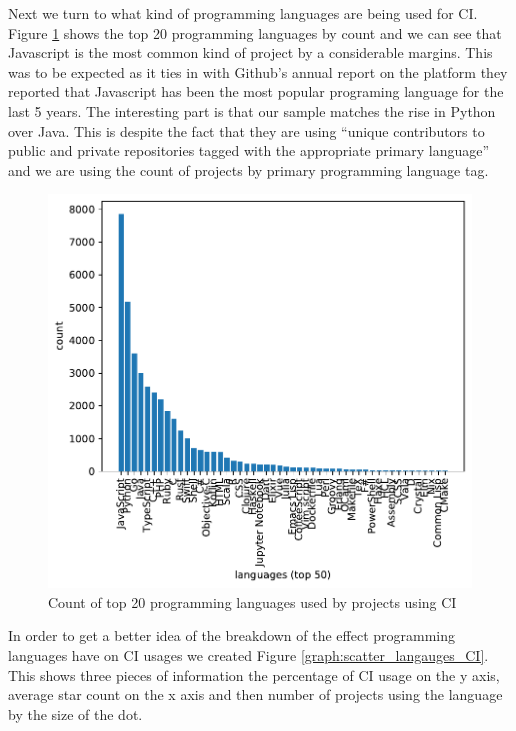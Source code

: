 \documentclass[10pt,conference]{IEEEtran}
\begin{document}
Next we turn to what kind of programming languages are being used for CI. Figure \ref{graph:programming_langs_count_ci} shows the  top 20 programming languages by count and we can see that Javascript is the most common kind of project by a considerable margins. This was to be expected as it ties in with Github's annual report \cite{GithubOctoverseResults} on the platform they reported that Javascript has been the most popular programing language for the last 5 years. The interesting part is that our sample matches the rise in Python over Java. This is despite the fact that they are using \enquote{unique contributors to public and private repositories tagged with the appropriate primary language} and we are using the count of projects by primary programming language tag. 

\begin{figure}[!h]
  \centering
  \includegraphics[width=.8\textwidth]{../src/results/languages-topn.pdf}
  \caption{Count of top 20 programming languages used by projects using CI}
  \label{graph:programming_langs_count_ci}
\end{figure}

In order to get a better idea of the breakdown of the effect programming languages have on CI usages we created Figure \ref{graph:scatter_langauges_CI}. This shows three pieces of information the percentage of CI usage on the y axis, average star count on the x axis and then number of projects using the language by the size of the dot. 
\end{document}
